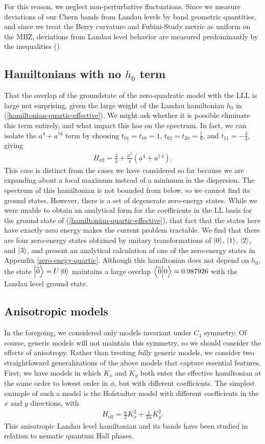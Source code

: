 \documentclass[aps,prb,twocolumn,letterpaper,twoside,nobalancelastpage,groupedaddress,amsmath,amssymb,floatfix,citeautoscript]{revtex4-1}
\begin{document}
For this reason, we neglect non-perturbative fluctuations. Since we measure deviations of our Chern bands from Landau levels by band geometric quantities, and since we treat the Berry curvature and Fubini-Study metric as uniform on the MBZ, deviations from Landau level behavior are measured predominantly by the inequalities ()

\subsection{Hamiltonians with no $h_0$ term}
That the overlap of the groundstate of the zero-quadratic model with the LLL is large not surprising, given the large weight of the Landau hamiltonian $h_0$ in (\ref{hamiltonian-quartic-effective}). We might ask whether it is possible eliminate this term entirely, and what impact this has on the spectrum. In fact, we can isolate the $a^4 + a^{\dag 4}$ term by choosing $t_{01} = t_{10} = 1$, $t_{02} = t_{20} = \frac{1}{8}$, and $t_{11} = - \frac{3}{4}$, giving
\begin{align*}
H_{\text{eff}} = \frac{3}{2} + \frac{\phi^2}{4}(a^4 + a^{\dag\,4}).
\end{align*}
This case is distinct from the cases we have considered so far because we are expanding about a local maximum instead of a minimum in the dispersion. The spectrum of this hamiltonian is not bounded from below, so we cannot find its ground states. However, there is a set of degenerate zero-energy states. While we were unable to obtain an analytical form for the coefficients in the LL basis for the ground state of (\ref{hamiltonian-quartic-effective}), that fact that the states here have exactly zero energy makes the current problem tractable. We find that there are four zero-energy states obtained by unitary transformations of $\ket{0}$, $\ket{1}$, $\ket{2}$, and $\ket{3}$, and present an analytical calculation of one of the zero-energy states in Appendix \ref{zero-enegy-quartic}. Although this hamiltonian does not depend on $h_0$, the state $\ket{\widetilde{0}} = U\ket{0}$ maintains a large overlap $\braket{\widetilde{0}}{0} \approx 0.987926$ with the Landau level ground state.

\subsection{Anisotropic models}
In the foregoing, we considered only models invariant under $C_4$ symmetry. Of course, generic models will not maintain this symmetry, so we should consider the effects of anisotropy. Rather than treating fully generic models, we consider two straightfoward generalizations of the above models that capture essential features. First, we have models in which $K_x$ and $K_y$ both enter the effective hamiltonian at the same order to lowest order in $\phi$, but with different coefficients. The simplest example of such a model is the Hofstadter model with different coefficients in the $x$ and $y$ directions, with
\begin{align*}
H_{\text{eff}} = \frac{\alpha}{2} K_x^{2} +  \frac{1}{2\alpha}K_y^{2}.
\end{align*}
This anisotropic Landau level hamiltonian and its bands have been studied in relation to nematic quantum Hall phases.
\end{document}
